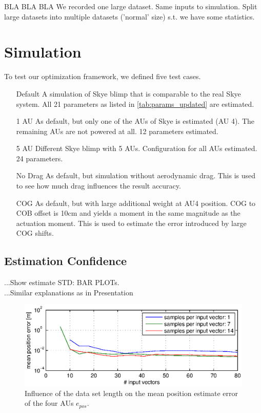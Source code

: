 BLA BLA BLA
We recorded one large dataset.
Same inputs to simulation.
Split large datasets into multiple datasets ('normal' size) s.t. we have some statistics.

\section{Simulation}
To test our optimization framework, we defined five test cases.
\begin{itemize}
\item[Default] A simulation of Skye blimp that is comparable to the real Skye system. All 21 parameters as listed in \cref{tab:params_updated} are estimated.
\item[1 AU] As default, but only one of the AUs of Skye is estimated (AU 4). The remaining AUs are not powered at all. 12 parameters estimated.
\item[5 AU] Different Skye blimp with 5 AUs. Configuration for all AUs estimated. 24 parameters.
\item[No Drag] As default, but simulation without aerodynamic drag. This is used to see how much drag influences the result accuracy.
\item[COG] As default, but with large additional weight at AU4 position. COG to COB offset is 10cm and yields a moment in the same magnitude as the actuation moment. This is used to estimate the error introduced by large COG shifts.
\end{itemize}
\subsection{Estimation Confidence}

...Show estimate STD: BAR PLOTs.\\
...Similar explanations as in Presentation

\begin{figure}[hbtp]
\centering
\includegraphics[width = \textwidth]{images/results/input_length_vs_position_error.eps}
\caption{Influence of the data set length on the mean position estimate error of the four AUs $e_{pos}$.}
\label{fig:result_inputlength}
\end{figure}

